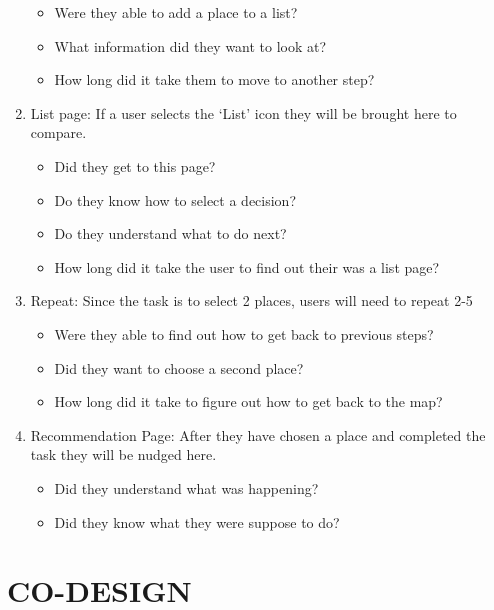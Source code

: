 \documentclass[a4 paper, 10pt]{article}
\begin{document}
\begin{enumerate}
\begin{itemize}
                    \item Were they able to add a place to a list?
                    \item What information did they want to look at?
                    \item How long did it take them to move to another step?
                \end{itemize}
            \item List page:
            If a user selects the ‘List’ icon they will be brought here to compare.
                \begin{itemize}            
                    \item Did they get to this page?
                    \item Do they know how to select a decision?
                    \item Do they understand what to do next?
                    \item How long did it take the user to find out their was a list page?
                \end{itemize}
            \item Repeat: 
            Since the task is to select 2 places, users will need to repeat 2-5
                \begin{itemize}
                    \item Were they able to find out how to get back to previous steps?
                    \item Did they want to choose a second place?
                    \item How long did it take to figure out how to get back to the map?
                \end{itemize}
            \item Recommendation Page:
            After they have chosen a place and completed the task they will be nudged here.
                \begin{itemize}
                    \item Did they understand what was happening?
                    \item Did they know what they were suppose to do?
                \end{itemize}        
        \end{enumerate}

\section*{CO-DESIGN}
\end{document}

